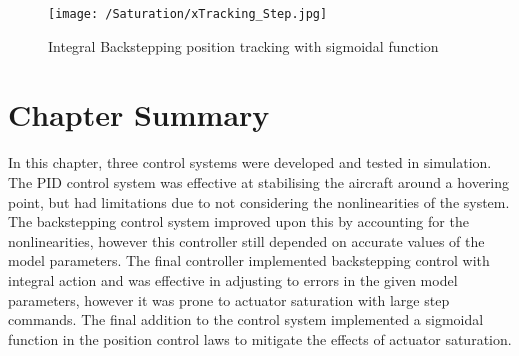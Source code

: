 \begin{figure}[htb]
\begin{center}
	\texttt{[image: /Saturation/xTracking\_Step.jpg]}%
	\end{center}
	\caption{Integral Backstepping position tracking with sigmoidal function}%
	\label{fig:SatStep}%
\end{figure}



\section{Chapter Summary}
In this chapter, three control systems were developed and tested in simulation. The PID control system was effective at stabilising the aircraft around a hovering point, but had limitations due to not considering the nonlinearities of the system. The backstepping control system improved upon this by accounting for the nonlinearities, however this controller still depended on accurate values of the model parameters. The final controller implemented backstepping control with integral action and was effective in adjusting to errors in the given model parameters, however it was prone to actuator saturation with large step commands. The final addition to the control system implemented a sigmoidal function in the position control laws to mitigate the effects of actuator saturation.



\clearpage



